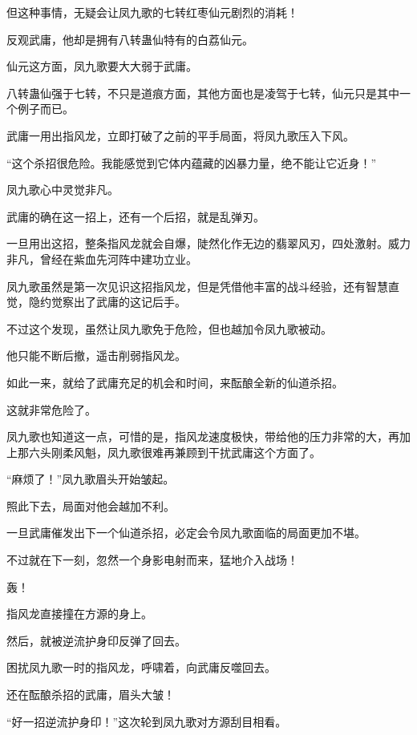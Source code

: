 \begin{this_body}
但这种事情，无疑会让凤九歌的七转红枣仙元剧烈的消耗！

反观武庸，他却是拥有八转蛊仙特有的白荔仙元。

仙元这方面，凤九歌要大大弱于武庸。

八转蛊仙强于七转，不只是道痕方面，其他方面也是凌驾于七转，仙元只是其中一个例子而已。

武庸一用出指风龙，立即打破了之前的平手局面，将凤九歌压入下风。

“这个杀招很危险。我能感觉到它体内蕴藏的凶暴力量，绝不能让它近身！”

凤九歌心中灵觉非凡。

武庸的确在这一招上，还有一个后招，就是乱弹刃。

一旦用出这招，整条指风龙就会自爆，陡然化作无边的翡翠风刃，四处激射。威力非凡，曾经在紫血先河阵中建功立业。

凤九歌虽然是第一次见识这招指风龙，但是凭借他丰富的战斗经验，还有智慧直觉，隐约觉察出了武庸的这记后手。

不过这个发现，虽然让凤九歌免于危险，但也越加令凤九歌被动。

他只能不断后撤，遥击削弱指风龙。

如此一来，就给了武庸充足的机会和时间，来酝酿全新的仙道杀招。

这就非常危险了。

凤九歌也知道这一点，可惜的是，指风龙速度极快，带给他的压力非常的大，再加上那六头刚柔风魁，凤九歌很难再兼顾到干扰武庸这个方面了。

“麻烦了！”凤九歌眉头开始皱起。

照此下去，局面对他会越加不利。

一旦武庸催发出下一个仙道杀招，必定会令凤九歌面临的局面更加不堪。

不过就在下一刻，忽然一个身影电射而来，猛地介入战场！

轰！

指风龙直接撞在方源的身上。

然后，就被逆流护身印反弹了回去。

困扰凤九歌一时的指风龙，呼啸着，向武庸反噬回去。

还在酝酿杀招的武庸，眉头大皱！

“好一招逆流护身印！”这次轮到凤九歌对方源刮目相看。

\end{this_body}

